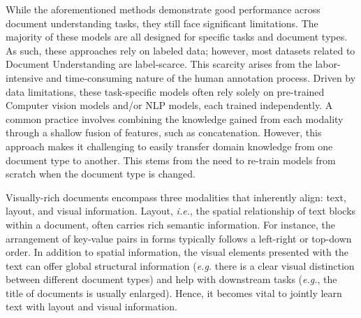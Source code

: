 While the aforementioned methods demonstrate good performance across document understanding tasks, they still face significant limitations. The majority of these models are all designed for specific tasks and document types. As such, these approaches rely on labeled data; however, most datasets related to Document Understanding are label-scarce. This scarcity arises from the labor-intensive and time-consuming nature of the human annotation process. Driven by data limitations, these task-specific models often rely solely on pre-trained Computer vision models and/or \ac{NLP} models, each trained independently. A common practice involves combining the knowledge gained from each modality through a shallow fusion of features, such as concatenation. However, this approach makes it challenging to easily transfer domain knowledge from one document type to another. This stems from the need to re-train models from scratch when the document type is changed.



Visually-rich documents encompass three modalities that inherently align: text, layout, and visual information. Layout, \textit{i.e.}, the spatial relationship of text blocks within a document, often carries rich semantic information. For instance, the arrangement of key-value pairs in forms typically follows a left-right or top-down order. In addition to spatial information, the visual elements presented with the text can offer global structural information (\textit{e.g.} there is a clear visual distinction between different document types) and help with downstream tasks (\textit{e.g.}, the title of documents is usually enlarged). Hence, it becomes vital to jointly learn text with layout and visual information.

